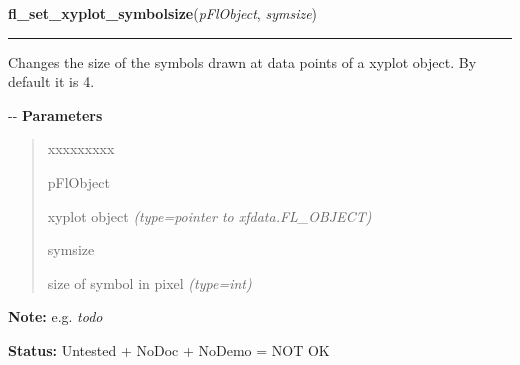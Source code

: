 \hspace{.8\funcindent}\begin{boxedminipage}{\funcwidth}

    \raggedright \textbf{fl\_set\_xyplot\_symbolsize}(\textit{pFlObject}, \textit{symsize})

    \vspace{-1.5ex}

    \rule{\textwidth}{0.5\fboxrule}
\setlength{\parskip}{2ex}

Changes the size of the symbols drawn at data points of a xyplot
object. By default it is 4.

-{}-
\setlength{\parskip}{1ex}
      \textbf{Parameters}
      \vspace{-1ex}

      \begin{quote}
        \begin{Ventry}{xxxxxxxxx}

          \item[pFlObject]


xyplot object
            {\it (type=pointer to xfdata.FL\_OBJECT)}

          \item[symsize]


size of symbol in pixel
            {\it (type=int)}

        \end{Ventry}

      \end{quote}

\textbf{Note:} 
e.g. \emph{todo}


\textbf{Status:} 
Untested + NoDoc + NoDemo = NOT OK


    \end{boxedminipage}

    \label{xformslib:flxyplot:fl_replace_xyplot_point}

    \vspace{0.5ex}

